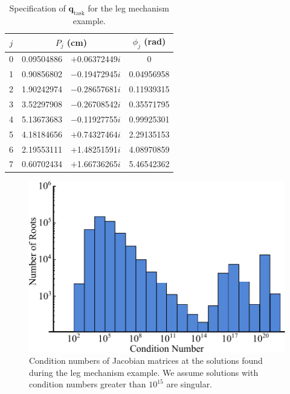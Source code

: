 \documentclass[journal]{IEEEtran}
\begin{document}
\begin{table}[h]
\caption{Specification of $\mathbf{q}_\text{task}$ for the leg mechanism example.}
\label{task_parameters}
\centering
\begin{tabular}{c|r@{}lc}
$j$ & \multicolumn{2}{c}{$P_j$ (cm)} & \multicolumn{1}{c}{$\phi_j$ (rad)} \\
\hline
0 & 0.09504886 & $+$0.06372449$i$ & 0 \\
1 & 0.90856802 & $-$0.19472945$i$ & 0.04956958 \\
2 & 1.90242974 & $-$0.28657681$i$ & 0.11939315 \\
3 & 3.52297908 & $-$0.26708542$i$ & 0.35571795 \\
4 & 5.13673683 & $-$0.11927755$i$ & 0.99925301 \\
5 & 4.18184656 & $+$0.74327464$i$ & 2.29135153 \\
6 & 2.19553111 & $+$1.48251591$i$ & 4.08970859 \\
7 & 0.60702434 & $+$1.66736265$i$ & 5.46542362 \\
\end{tabular}
\end{table}

\begin{figure}[!t]
\centering
\includegraphics[scale=0.5]{root_histogram}
\caption{Condition numbers of Jacobian matrices at the solutions found during the leg mechanism example.  We assume solutions with condition numbers greater than $10^{15}$ are singular.}
\label{root_histogram}
\end{figure}
\end{document}
